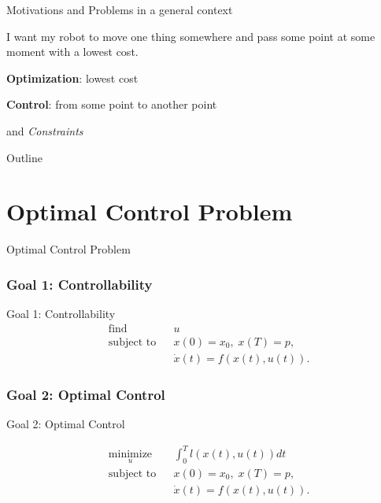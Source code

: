 \documentclass{beamer}
\begin{document}
\begin{frame}{Motivations and Problems in a general context}

I want my robot to move one thing somewhere and pass some point at some moment with a lowest cost.

\bigskip

\textbf{Optimization}: lowest cost

\textbf{Control}: from some point to another point

and \emph{Constraints}
\end{frame}


\begin{frame}{Outline}

\tableofcontents
\end{frame}

\section{Optimal Control Problem}

  \begin{frame}{Optimal Control	Problem}
    \subsubsection{Goal 1: Controllability}

Goal 1: Controllability
	\begin{equation}
	\begin{aligned}
	& {\text{find}}
	& & u \\
	& \text{subject to}
	& & x(0) = x_0, \; x(T) = p, \\
	&&& \dot{x} (t) = f(x(t), u(t)).
	\end{aligned}
	\end{equation}
	
	\subsubsection{Goal 2: Optimal Control}

Goal 2: Optimal Control	 
	
	\begin{equation}
	\begin{aligned}
	& \underset{u}{\text{minimize}}
	& & \int_0^T l(x(t),u(t)) dt \\
	& \text{subject to}
	& & x(0) = x_0, \; x(T) = p, \\
	&&& \dot{x} (t) = f(x(t), u(t)).
	\end{aligned}
	\end{equation}
	
  \end{frame}
  
\end{document}

